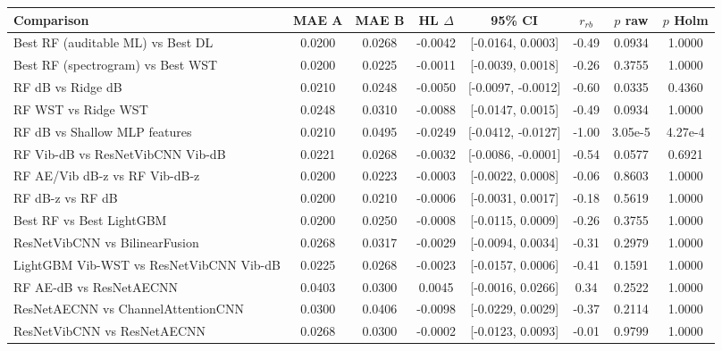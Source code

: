 \begin{tabular}{@{}lccccccc@{}}
\toprule
Comparison & MAE A & MAE B & HL $\Delta$ & 95\% CI & $r_{rb}$ & $p$ raw & $p$ Holm \\
\midrule
Best RF (auditable ML) vs Best DL & 0.0200 & 0.0268 & -0.0042 & [-0.0164, 0.0003] & -0.49 & 0.0934 & 1.0000 \\
Best RF (spectrogram) vs Best WST & 0.0200 & 0.0225 & -0.0011 & [-0.0039, 0.0018] & -0.26 & 0.3755 & 1.0000 \\
RF dB vs Ridge dB & 0.0210 & 0.0248 & -0.0050 & [-0.0097, -0.0012] & -0.60 & 0.0335 & 0.4360 \\
RF WST vs Ridge WST & 0.0248 & 0.0310 & -0.0088 & [-0.0147, 0.0015] & -0.49 & 0.0934 & 1.0000 \\
RF dB vs Shallow MLP features & 0.0210 & 0.0495 & -0.0249 & [-0.0412, -0.0127] & -1.00 & 3.05e-5 & 4.27e-4 \\
RF Vib-dB vs ResNetVibCNN Vib-dB & 0.0221 & 0.0268 & -0.0032 & [-0.0086, -0.0001] & -0.54 & 0.0577 & 0.6921 \\
RF AE/Vib dB-z vs RF Vib-dB-z & 0.0200 & 0.0223 & -0.0003 & [-0.0022, 0.0008] & -0.06 & 0.8603 & 1.0000 \\
RF dB-z vs RF dB & 0.0200 & 0.0210 & -0.0006 & [-0.0031, 0.0017] & -0.18 & 0.5619 & 1.0000 \\
Best RF vs Best LightGBM & 0.0200 & 0.0250 & -0.0008 & [-0.0115, 0.0009] & -0.26 & 0.3755 & 1.0000 \\
ResNetVibCNN vs BilinearFusion & 0.0268 & 0.0317 & -0.0029 & [-0.0094, 0.0034] & -0.31 & 0.2979 & 1.0000 \\
LightGBM Vib-WST vs ResNetVibCNN Vib-dB & 0.0225 & 0.0268 & -0.0023 & [-0.0157, 0.0006] & -0.41 & 0.1591 & 1.0000 \\
RF AE-dB vs ResNetAECNN & 0.0403 & 0.0300 & 0.0045 & [-0.0016, 0.0266] & 0.34 & 0.2522 & 1.0000 \\
ResNetAECNN vs ChannelAttentionCNN & 0.0300 & 0.0406 & -0.0098 & [-0.0229, 0.0029] & -0.37 & 0.2114 & 1.0000 \\
ResNetVibCNN vs ResNetAECNN & 0.0268 & 0.0300 & -0.0002 & [-0.0123, 0.0093] & -0.01 & 0.9799 & 1.0000 \\
\bottomrule
\end{tabular}
